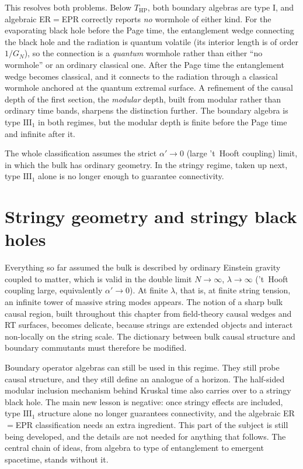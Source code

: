 This resolves both problems. Below $T_{\text{HP}}$, both boundary algebras are type I, and algebraic
ER$=$EPR correctly reports \emph{no} wormhole of either kind. For the evaporating black hole before the Page
time, the entanglement wedge connecting the black hole and the radiation is quantum volatile (its interior
length is of order $1/G_N$), so the connection is a \emph{quantum} wormhole rather than either ``no wormhole''
or an ordinary classical one. After the Page time the entanglement wedge becomes classical, and it connects to
the radiation through a classical wormhole anchored at the quantum extremal surface. A refinement of the causal
depth of the first section, the \emph{modular} depth, built from modular rather than ordinary time bands,
sharpens the distinction further. The boundary algebra is type $\mathrm{III}_1$ in both regimes, but the
modular depth is finite before the Page time and infinite after it.

The whole classification assumes the strict $\alpha'\to0$ (large 't~Hooft coupling) limit, in which the bulk
has ordinary geometry. In the stringy regime, taken up next, type $\mathrm{III}_1$ alone is no longer enough
to guarantee connectivity.

\section{Stringy geometry and stringy black holes}

Everything so far assumed the bulk is described by ordinary Einstein gravity coupled to matter, which is valid
in the double limit $N\to\infty$, $\lambda\to\infty$ ('t~Hooft coupling large, equivalently $\alpha'\to0$). At
finite $\lambda$, that is, at finite string tension, an infinite tower of massive string modes appears. The
notion of a sharp bulk causal region, built throughout this chapter from field-theory causal wedges and RT
surfaces, becomes delicate, because strings are extended objects and interact non-locally on the string scale.
The dictionary between bulk causal structure and boundary commutants must therefore be modified.

Boundary operator algebras can still be used in this regime. They still probe causal structure, and they still
define an analogue of a horizon. The half-sided modular inclusion mechanism behind Kruskal time also carries
over to a stringy black hole. The main new lesson is negative: once stringy effects are included, type
$\mathrm{III}_1$ structure alone no longer guarantees connectivity, and the algebraic ER$=$EPR classification
needs an extra ingredient. This part of the subject is still being developed, and the details are not needed
for anything that follows. The central chain of ideas, from algebra to type of entanglement to emergent
spacetime, stands without it.

